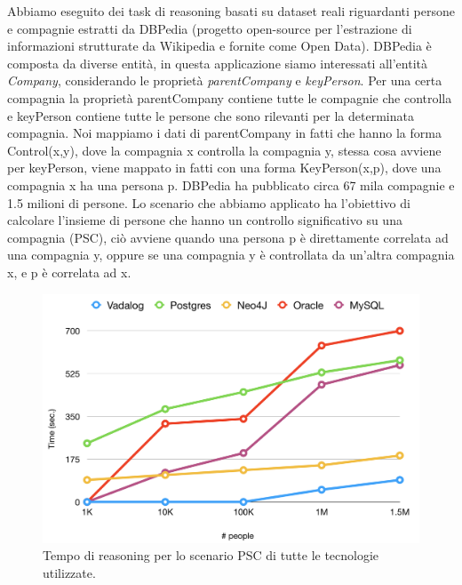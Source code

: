 Abbiamo eseguito dei task di reasoning basati su dataset reali riguardanti persone e compagnie estratti da DBPedia (progetto open-source per l'estrazione di informazioni strutturate da Wikipedia e fornite come Open Data). \newline
DBPedia è composta da diverse entità, in questa applicazione siamo interessati all'entità \emph{Company}, considerando le proprietà \emph{parentCompany} e \emph{keyPerson}. Per una certa compagnia la proprietà parentCompany contiene tutte le compagnie che controlla e keyPerson contiene tutte le persone che sono rilevanti per la determinata compagnia. \newline
Noi mappiamo i dati di parentCompany in fatti che hanno la forma Control(x,y), dove la compagnia x controlla la compagnia y, stessa cosa avviene per keyPerson, viene mappato in fatti con una forma KeyPerson(x,p), dove una compagnia x ha una persona p. DBPedia ha pubblicato circa 67 mila compagnie e 1.5 milioni di persone. \newline
Lo scenario che abbiamo applicato ha l'obiettivo di calcolare l'insieme di persone che hanno un controllo significativo su una compagnia (PSC), ciò avviene quando una persona p è direttamente correlata ad una compagnia y, oppure se una compagnia y è controllata da un'altra compagnia x, e p è correlata ad x. \newline
\begin{figure}[h]
	\centering
	\includegraphics[width=0.8\linewidth]{figure/dbpediaRisultato}
	\caption{Tempo di reasoning per lo scenario PSC di tutte le tecnologie utilizzate.}
	\label{fig:dbpediaRisultato}
\end{figure}

